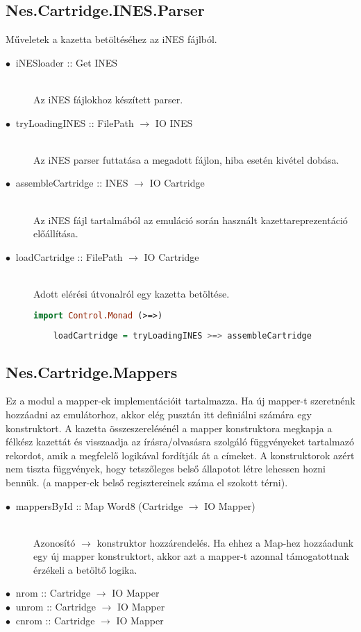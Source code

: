 \subsection{Nes.Cartridge.INES.Parser}

Műveletek a kazetta betöltéséhez az iNES fájlból.

\begin{description}
	\item[$\bullet\:$ iNESloader :: Get INES] \hfill \\
	Az iNES fájlokhoz készített parser.
	\item[$\bullet\:$ tryLoadingINES :: FilePath $\rightarrow$ IO INES] \hfill \\
	Az iNES parser futtatása a megadott fájlon, hiba esetén kivétel dobása.
	\item[$\bullet\:$ assembleCartridge :: INES $\rightarrow$ IO Cartridge] \hfill \\
	Az iNES fájl tartalmából az emuláció során használt kazettareprezentáció előállítása.
	\item[$\bullet\:$ loadCartridge :: FilePath $\rightarrow$ IO Cartridge] \hfill \\
	Adott elérési útvonalról egy kazetta betöltése.
	\begin{lstlisting}[language=Haskell]
	import Control.Monad (>=>)
	
	loadCartridge = tryLoadingINES >=> assembleCartridge
	\end{lstlisting}
\end{description}

\subsection{Nes.Cartridge.Mappers}

Ez a modul a mapper-ek implementációit tartalmazza. Ha új mapper-t szeretnénk hozzáadni az emulátorhoz, akkor elég pusztán itt definiálni számára egy konstruktort. A kazetta összeszerelésénél a mapper konstruktora megkapja a félkész kazettát és visszaadja az írásra/olvasásra szolgáló függvényeket tartalmazó rekordot, amik a megfelelő logikával fordítják át a címeket.
A konstruktorok azért nem tiszta függvények, hogy tetszőleges belső állapotot létre lehessen hozni bennük. (a mapper-ek belső regisztereinek száma el szokott térni).

\begin{description}
	\item[$\bullet\:$ mappersById :: Map Word8 (Cartridge $\rightarrow$ IO Mapper)] \hfill \\
	Azonosító $\rightarrow$ konstruktor hozzárendelés. Ha ehhez a Map-hez hozzáadunk egy új mapper konstruktort, akkor azt a mapper-t azonnal támogatottnak érzékeli a betöltő logika.
	\item[$\bullet\:$ nrom  :: Cartridge $\rightarrow$ IO Mapper]
	\item[$\bullet\:$ unrom :: Cartridge $\rightarrow$ IO Mapper]
	\item[$\bullet\:$ cnrom :: Cartridge $\rightarrow$ IO Mapper]
\end{description}

